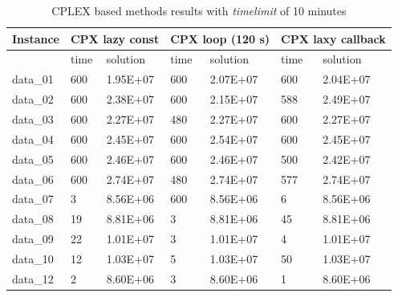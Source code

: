\begin{table}[!h]
\caption{\textsc{CPLEX} based methods results with \textit{timelimit} of 10 minutes}
\begin{tabular}{lllllll}
\hline
Instance & \multicolumn{2}{l}{\textbf{CPX lazy const}} & \multicolumn{2}{l}{\textbf{CPX loop (120 s)}} & \multicolumn{2}{l}{\textbf{CPX laxy callback}} \\ \hline
         & time               & solution               & time                & solution                & time                 & solution                \\ \hline
data\_01 & 600                & 1.95E+07               & 600                 & 2.07E+07                & 600                  & 2.04E+07                \\
data\_02 & 600                & 2.38E+07               & 600                 & 2.15E+07                & 588                  & 2.49E+07                \\
data\_03 & 600                & 2.27E+07               & 480                 & 2.27E+07                & 600                  & 2.27E+07                \\
data\_04 & 600                & 2.45E+07               & 600                 & 2.54E+07                & 600                  & 2.45E+07                \\
data\_05 & 600                & 2.46E+07               & 600                 & 2.46E+07                & 500                  & 2.42E+07                \\
data\_06 & 600                & 2.74E+07               & 480                 & 2.74E+07                & 577                  & 2.74E+07                \\
data\_07 & 3                  & 8.56E+06               & 600                 & 8.56E+06                & 6                    & 8.56E+06                \\
data\_08 & 19                 & 8.81E+06               & 3                   & 8.81E+06                & 45                   & 8.81E+06                \\
data\_09 & 22                 & 1.01E+07               & 3                   & 1.01E+07                & 4                    & 1.01E+07                \\
data\_10 & 12                 & 1.03E+07               & 5                   & 1.03E+07                & 50                   & 1.03E+07                \\
data\_12 & 2                  & 8.60E+06               & 3                   & 8.60E+06                & 1                    & 8.60E+06                \\

\end{tabular}
\end{table}
